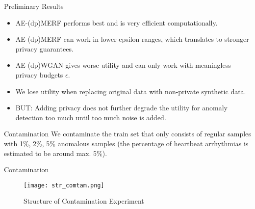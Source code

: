 \begin{frame}{Preliminary Results}
    \begin{itemize}
        \item<1-> \alert{AE-(dp)MERF performs best} and is very efficient computationally.
        \item<2-> AE-(dp)MERF can work in \alert{lower epsilon ranges}, which translates to \alert{stronger privacy guarantees}.
        \item<3-> \alert{AE-(dp)WGAN gives worse utility} and can only work with meaningless privacy budgets $\epsilon$.
        \item<4-> We lose utility when \alert{replacing original data with non-private synthetic} data.
        \item<5-> BUT: Adding \alert{privacy does not further degrade the utility} for anomaly detection too much until too much noise is added.
    \end{itemize}
\end{frame}

\begin{frame}{Contamination}
    We \alert{contaminate} the train set that only consists of regular samples with \alert{1\%, 2\%, 5\% anomalous samples} (the percentage of heartbeat arrhythmias is estimated to be around max. 5\%).
\end{frame}

\begin{frame}{Contamination}

    \begin{figure}[h]
        \centering
        \texttt{[image: str\_comtam.png]}
        \caption{Structure of Contamination Experiment}
        \label{fig:enter-label}
    \end{figure}

\end{frame}

